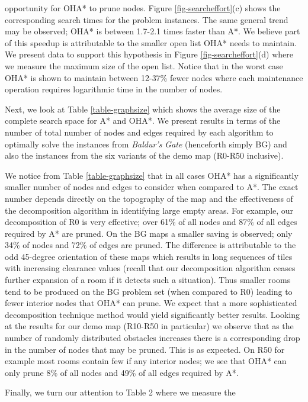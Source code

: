 opportunity for OHA* to prune nodes. 
Figure \ref{fig-searcheffort}(c) shows the corresponding search times for the problem instances. 
The same general trend may be observed; OHA* is between 1.7-2.1 times faster than A*.
We believe part of this speedup is attributable to the smaller open list OHA* needs to maintain.
We present data to support this hypothesis in Figure \ref{fig-searcheffort}(d) where we measure 
the maximum size of the open list. 
Notice that in the worst case OHA* is shown to maintain between 12-37\% fewer nodes where each
maintenance operation requires logarithmic time in the number of nodes.
\par
Next, we look at Table \ref{table-graphsize} which shows the average size of the complete search
space for A* and OHA*.
We present results in terms of the number of total number of nodes and edges required by each algorithm
to optimally solve the instances from \emph{Baldur's Gate} (henceforth simply BG) and also 
the instances from the six variants of the demo map (R0-R50 inclusive).

We notice from Table \ref{table-graphsize} that in all cases OHA* has a significantly smaller number 
of nodes and edges to consider when compared to A*.
The exact number depends directly on the topography of the map and the 
effectiveness of the decomposition algorithm in identifying large empty areas.
For example, our decomposition of R0 is very effective; over 61\% of all nodes and 87\% of all 
edges required by A* are pruned.
On the BG maps a smaller saving is observed; only 34\% of nodes and 72\% of edges are pruned.
The difference is attributable to the odd 45-degree orientation of these maps which results in 
long sequences of tiles with increasing clearance values 
(recall that our decomposition algorithm ceases further expansion of a room if it detects 
such a situation).
Thus smaller rooms tend to be produced on the BG problem set (when compared to R0) leading to 
fewer interior nodes that OHA* can prune. 
We expect that a more sophisticated decomposition technique method would yield significantly 
better results.
Looking at the results for our demo map (R10-R50 in particular) we observe that as the number of 
randomly distributed obstacles increases there is a corresponding drop in the number of nodes that may be 
pruned.
This is as expected. 
On R50 for example most rooms contain few if any interior nodes; 
we see that OHA* can only prune 8\% of all nodes and 49\% of all edges required by A*.
\par
Finally, we turn our attention to Table 2 where we measure the 
